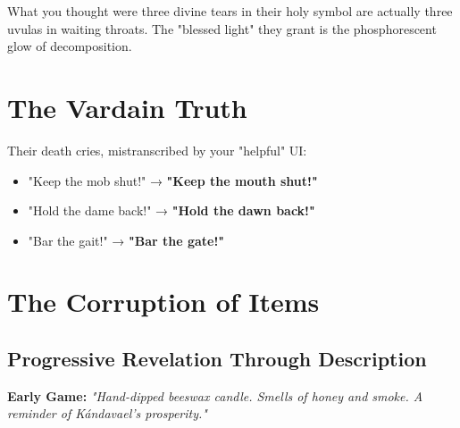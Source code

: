 \documentclass[11pt,a4paper,twoside]{book}
\begin{document}
What you thought were three divine tears in their holy symbol are actually three uvulas in waiting throats. The "blessed light" they grant is the phosphorescent glow of decomposition.

\section{The Vardain Truth}

\begin{center}
\end{center}

Their death cries, mistranscribed by your "helpful" UI:
\begin{itemize}
    \item "Keep the mob shut!" → \textbf{"Keep the mouth shut!"}
    \item "Hold the dame back!" → \textbf{"Hold the dawn back!"}
    \item "Bar the gait!" → \textbf{"Bar the gate!"}
\end{itemize}

\section{The Corruption of Items}

\subsection{Progressive Revelation Through Description}

\begin{tcolorbox}[itembox={Festival Candle}]
\textbf{Early Game:} \textit{"Hand-dipped beeswax candle. Smells of honey and smoke. A reminder of Kándavael's prosperity."}
\end{tcolorbox}
\end{document}
